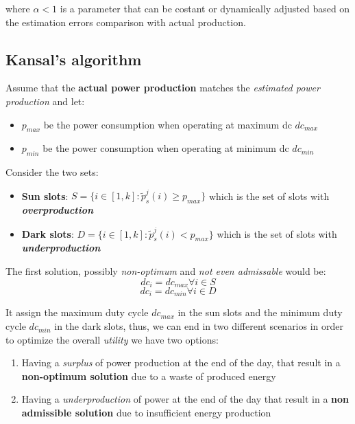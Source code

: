 \documentclass[10pt,a4paper]{report}
\theoremstyle{definition}
\begin{document}
where $\alpha < 1$  is a parameter that can be costant or dynamically adjusted based on the estimation errors comparison with actual production.
\subsection{Kansal's algorithm}\label{sec:algorithm}
Assume that the \textbf{actual power production} matches the \textit{estimated power production} and let:
\begin{itemize}
	\item 
	$p_{max}$ be the power consumption when operating at maximum dc $dc_{max}$
	\item 
	$p_{min}$ be the power consumption when operating at minimum dc $dc_{min}$
\end{itemize}
	Consider the two sets:
\begin{itemize}
	\item 
	\textbf{Sun slots}: $S = \{i \in [1,k]: \tilde{p}_{s}^{j}(i) \geq p_{max}\}$ which is the set of slots with \textit{\textbf{overproduction}}
	\item 
	\textbf{Dark slots}: $D = \{i \in [1,k]: \tilde{p}_{s}^{j}(i) < p_{max}\}$ which is the set of slots with \textit{\textbf{underproduction}}
\end{itemize}

The first solution, possibly \textit{non-optimum} and \textit{not even admissable} would be:
\begin{equation}
	dc_{i} = dc_{max} \forall i \in S
\end{equation}
\begin{equation}
	dc_{i} = dc_{min} \forall i \in D
\end{equation}

It assign the maximum duty cycle $dc_{max}$ in the sun slots and the minimum duty cycle $dc_{min}$ in the dark slots, thus, we can end in two different scenarios in order to optimize the overall \textit{utility} we have two options:
\begin{enumerate}
	\item 
	Having a \textit{surplus} of power production at the end of the day, that result in a \textbf{non-optimum solution} due to a waste of produced energy
	\item 
	Having a \textit{underproduction} of power at the end of the day that result in a \textbf{non admissible solution} due to insufficient energy production
\end{enumerate}
\end{document}
